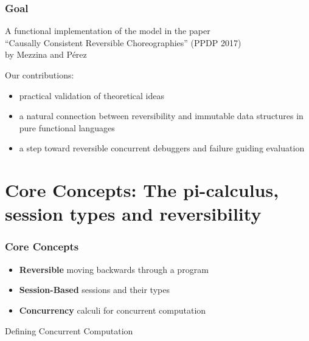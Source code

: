 \documentclass[12pt]{beamer}
\begin{document}
\begin{frame}
\frametitle{Goal}
\begin{center}

    A functional implementation of the model in the paper \\ ``Causally Consistent Reversible Choreographies'' (PPDP 2017) \\ by Mezzina and P\'{e}rez 
\end{center}
\bigskip

Our contributions:
\begin{itemize}
    \item practical validation of theoretical ideas
    \item a natural connection between reversibility and immutable data structures in pure functional languages 
    \item a step toward reversible concurrent debuggers and failure guiding evaluation
\end{itemize}


\end{frame}




\section{Core Concepts: The pi-calculus, session types and reversibility}


\begin{frame}
\frametitle{Core Concepts}
\begin{center}


\begin{itemize}
    \item \textbf{Reversible} moving backwards through a program
    \item \textbf{Session-Based} sessions and their types 
    \item \textbf{Concurrency} calculi for concurrent computation
\end{itemize}


\end{center}
\end{frame}


\begin{frame}
\begin{center}
    \LARGE{Defining Concurrent Computation} 
\end{center}
\end{frame}
\end{document}
